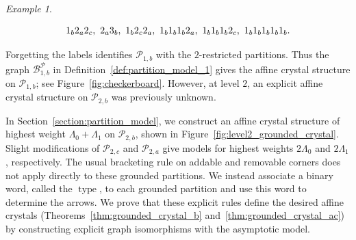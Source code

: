 \documentclass[11pt]{article}
\theoremstyle{definition}
\theoremstyle{remark}
\newtheorem{example}[theorem]{Example}
\theoremstyle{definition}
\numberwithin{equation}{section}
\newcommand{\type}{\operatorname{type}}
\begin{document}
\begin{example}
\begin{enumerate}[
  label=(\roman*),
  leftmargin=0pt,
  labelwidth=1.4em,   %
  labelsep=0.3em,     %
  itemindent=!,
  align=left,
  itemsep=0pt
]
 \begin{align*}
\textcolor{black}{1_b} \textcolor{black}{2_a} \textcolor{black}{2_c},\ \textcolor{black}{2_a} \textcolor{black}{3_b},\ \textcolor{black}{1_b} \textcolor{black}{2_c} \textcolor{black}{2_a},\ \textcolor{black}{1_b} \textcolor{black}{1_b} \textcolor{black}{1_b} \textcolor{black}{2_a},\ \textcolor{black}{1_b} \textcolor{black}{1_b} \textcolor{black}{1_b} \textcolor{black}{2_c},\ \textcolor{black}{1_b} \textcolor{black}{1_b} \textcolor{black}{1_b} \textcolor{black}{1_b} \textcolor{black}{1_b}.
\end{align*}
\end{enumerate}
\end{example}

Forgetting the labels identifies \( \mathcal{P}_{1,b} \) with the
$2$-restricted partitions. Thus the graph
$\mathcal{B}_{1,b}^{\mathcal{P}}$ in
Definition~\ref{def:partition_model_1} gives the affine crystal
structure on \( \mathcal{P}_{1,b} \); see
Figure~\ref{fig:checkerboard}. However, at level $2$, an explicit
affine crystal structure on \( \mathcal{P}_{2,b} \) was previously
unknown.

In Section~\ref{section:partition_model}, we construct an affine crystal structure of highest weight \(\Lambda_0+\Lambda_1\) on \(\mathcal{P}_{2,b}\), shown in Figure~\ref{fig:level2_grounded_crystal}. Slight modifications of \(\mathcal{P}_{2,c}\) and \(\mathcal{P}_{2,a}\) give models for highest weights \(2\Lambda_0\) and \(2\Lambda_1\), respectively. The usual bracketing rule on addable and removable corners does not apply directly to these grounded partitions. We instead associate a binary word, called the \(\type\), to each grounded partition and use this word to determine the arrows. We prove that these explicit rules define the desired affine crystals (Theorems~\ref{thm:grounded_crystal_b} and~\ref{thm:grounded_crystal_ac}) by constructing explicit graph isomorphisms with the asymptotic model.
\end{document}
